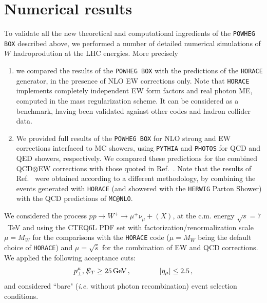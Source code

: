 \documentclass[11pt,a4paper]{article}
\newcommand\POWHEGBOX{\texttt{POWHEG BOX}}
\begin{document}
\section{Numerical results}
\label{sec:results}

To validate all the new theoretical and computational ingredients of the
\POWHEGBOX{} described above, we performed 
a number of detailed numerical simulations of $W$ hadroprodution at the LHC energies. 
More precisely
\begin{enumerate}

\item we compared the results of the \POWHEGBOX{} with the predictions of the \texttt{HORACE} generator, 
in the presence of NLO EW corrections only. Note that \texttt{HORACE} implements completely independent 
EW form factors and real photon ME, computed in the mass regularization scheme. It can be 
considered as a benchmark, having been validated against other codes and hadron collider data.

\item We provided full results of the \POWHEGBOX{} for NLO strong and EW corrections interfaced to MC showers, 
using \texttt{PYTHIA} and \texttt{PHOTOS} for QCD and QED showers, respectively. We compared these 
predictions for the combined QCD$\otimes$EW corrections with those quoted in 
Ref.~\cite{Balossini:2009sa}. Note that the results of Ref.~\cite{Balossini:2009sa} were obtained 
according to a different methodology, by combining the events generated
with \texttt{HORACE} (and showered with the \texttt{HERWIG} Parton Shower) with the 
QCD predictions of \texttt{MC@NLO}.

\end{enumerate}

We considered the process $p p \to W^+ \to \mu^+ \nu_{\mu} + (X)$, at the c.m. energy $\sqrt{s} = 7$~TeV 
and using the CTEQ6L PDF set with factorization/renormalization scale $\mu = M_W$ for the
comparisons with the \texttt{HORACE} code ($\mu = M_W$ being the default choice of \texttt{HORACE}) and
$\mu = \sqrt{\hat s}$ for the combination of EW and QCD corrections.
We applied the 
following acceptance cuts:
\begin{eqnarray}
p_\perp^\mu, \, \rlap{\slash}{\! E_T}  \geq 25 \, {\rm GeV} \, , \qquad \qquad |\eta_\mu| \leq 2.5 \, ,
\end{eqnarray}
and considered ``bare" ({\it i.e.} without photon recombination) event selection conditions.
\end{document}
